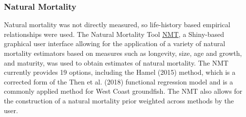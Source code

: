 \documentclass[11pt,
  english,
  a4paper,
]{article}
\begin{document}

\hypertarget{natural-mortality}{%
\subsubsection{Natural Mortality}\label{natural-mortality}}

\leavevmode\tagmcend\tagstructend

Natural mortality was not directly measured, so life-history based empirical relationships were used. The Natural Mortality Tool {\href{https://github.com/shcaba/Natural-Mortality-Tool}{NMT}\leavevmode\tagmcend\tagstructend}, a Shiny-based graphical user interface allowing for the application of a variety of natural mortality estimators based on measures such as longevity, size, age and growth, and maturity, was used to obtain estimates of natural mortality. The NMT currently provides 19 options, including the Hamel {(2015)\leavevmode\tagmcend\tagstructend} method, which is a corrected form of the Then et al. {(2018)\leavevmode\tagmcend\tagstructend} functional regression model and is a commonly applied method for West Coast groundfish. The NMT also allows for the construction of a natural mortality prior weighted across methods by the user.
\end{document}
